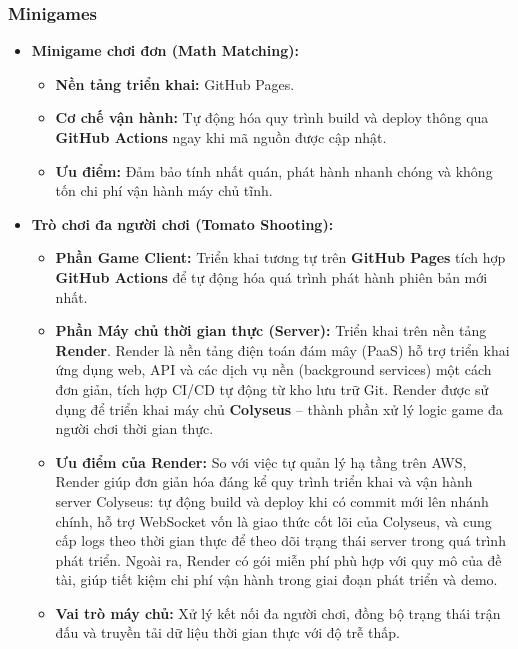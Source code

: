 \subsubsection{Minigames}
\begin{itemize}
	\item \textbf{Minigame chơi đơn (Math Matching):}
	\begin{itemize}
		\item \textbf{Nền tảng triển khai:} GitHub Pages.
		\item \textbf{Cơ chế vận hành:} Tự động hóa quy trình build và deploy thông qua \textbf{GitHub Actions} ngay khi mã nguồn được cập nhật.
		\item \textbf{Ưu điểm:} Đảm bảo tính nhất quán, phát hành nhanh chóng và không tốn chi phí vận hành máy chủ tĩnh.
	\end{itemize}
	
	\item \textbf{Trò chơi đa người chơi (Tomato Shooting):}
	\begin{itemize}
		\item \textbf{Phần Game Client:} Triển khai tương tự trên \textbf{GitHub Pages} tích hợp \textbf{GitHub Actions} để tự động hóa quá trình phát hành phiên bản mới nhất.
		\item \textbf{Phần Máy chủ thời gian thực (Server):} Triển khai trên nền tảng \textbf{Render}. Render là nền tảng điện toán đám mây (PaaS) hỗ trợ triển khai ứng dụng web, API và các dịch vụ nền (background services) một cách đơn giản, tích hợp CI/CD tự động từ kho lưu trữ Git. Render được sử dụng để triển khai máy chủ \textbf{Colyseus} -- thành phần xử lý logic game đa người chơi thời gian thực. 
		\item \textbf{Ưu điểm của Render:} So với việc tự quản lý hạ tầng trên AWS, Render giúp đơn giản hóa đáng kể quy trình triển khai và vận hành server Colyseus: tự động build và deploy khi có commit mới lên nhánh chính, hỗ trợ WebSocket vốn là giao thức cốt lõi của Colyseus, và cung cấp logs theo thời gian thực để theo dõi trạng thái server trong quá trình phát triển. Ngoài ra, Render có gói miễn phí phù hợp với quy mô của đề tài, giúp tiết kiệm chi phí vận hành trong giai đoạn phát triển và demo.
		\item \textbf{Vai trò máy chủ:} Xử lý kết nối đa người chơi, đồng bộ trạng thái trận đấu và truyền tải dữ liệu thời gian thực với độ trễ thấp.
	\end{itemize}
\end{itemize}


